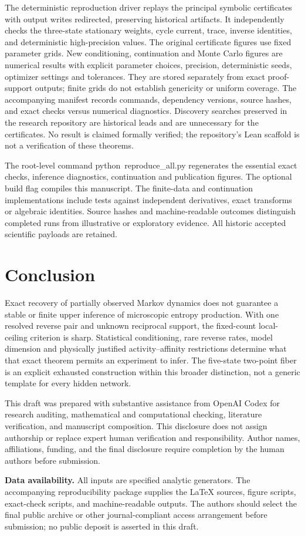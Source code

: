 \documentclass[aps,pre,onecolumn,11pt,longbibliography,notitlepage]{revtex4-2}
\newcommand{\1}{\mathbf 1}
\begin{document}
The deterministic reproduction driver replays the principal symbolic certificates with output writes redirected, preserving historical artifacts. It independently checks the three-state stationary weights, cycle current, trace, inverse identities, and deterministic high-precision values. The original certificate figures use fixed parameter grids. New conditioning, continuation and Monte Carlo figures are numerical results with explicit parameter choices, precision, deterministic seeds, optimizer settings and tolerances. They are stored separately from exact proof-support outputs; finite grids do not establish genericity or uniform coverage. The accompanying manifest records commands, dependency versions, source hashes, and exact checks versus numerical diagnostics. Discovery searches preserved in the research repository are historical leads and are unnecessary for the certificates. No result is claimed formally verified; the repository's Lean scaffold is not a verification of these theorems.


The root-level command \mbox{python reproduce\_all.py} regenerates the essential exact checks, inference diagnostics, continuation and publication figures. The optional build flag compiles this manuscript. The finite-data and continuation implementations include tests against independent derivatives, exact transforms or algebraic identities. Source hashes and machine-readable outcomes distinguish completed runs from illustrative or exploratory evidence. All historic accepted scientific payloads are retained.

\section{Conclusion}
Exact recovery of partially observed Markov dynamics does not guarantee a stable or finite upper inference of microscopic entropy production. With one resolved reverse pair and unknown reciprocal support, the fixed-count local-ceiling criterion is sharp. Statistical conditioning, rare reverse rates, model dimension and physically justified activity--affinity restrictions determine what that exact theorem permits an experiment to infer. The five-state two-point fiber is an explicit exhausted construction within this broader distinction, not a generic template for every hidden network.

\begin{acknowledgments}
This draft was prepared with substantive assistance from OpenAI Codex for research auditing, mathematical and computational checking, literature verification, and manuscript composition. This disclosure does not assign authorship or replace expert human verification and responsibility. Author names, affiliations, funding, and the final disclosure require completion by the human authors before submission.
\end{acknowledgments}
\noindent\textbf{Data availability.}
All inputs are specified analytic generators. The accompanying reproducibility package supplies the LaTeX sources, figure scripts, exact-check scripts, and machine-readable outputs. The authors should select the final public archive or other journal-compliant access arrangement before submission; no public deposit is asserted in this draft.

\appendix

\raggedright

\end{document}
